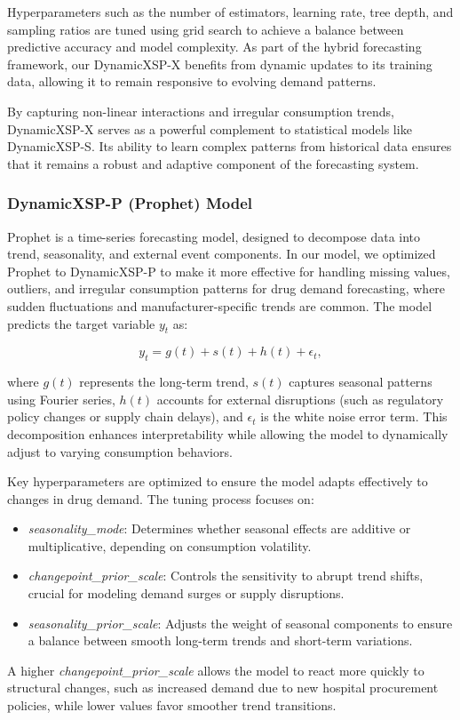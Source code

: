 \documentclass[journal]{IEEEtran}
\begin{document}
Hyperparameters such as the number of estimators, learning rate, tree depth, and sampling ratios are tuned using grid search to achieve a balance between predictive accuracy and model complexity. As part of the hybrid forecasting framework, our DynamicXSP-X benefits from dynamic updates to its training data, allowing it to remain responsive to evolving demand patterns.

By capturing non-linear interactions and irregular consumption trends, DynamicXSP-X serves as a powerful complement to statistical models like DynamicXSP-S. Its ability to learn complex patterns from historical data ensures that it remains a robust and adaptive component of the forecasting system.

\subsubsection{DynamicXSP-P (Prophet) Model}

Prophet is a time-series forecasting model, designed to decompose data into trend, seasonality, and external event components. In our model, we optimized Prophet to DynamicXSP-P to make it more effective for handling missing values, outliers, and irregular consumption patterns for drug demand forecasting, where sudden fluctuations and manufacturer-specific trends are common. The model predicts the target variable \(y_t\) as:

\begin{equation}
y_{t} = g(t) + s(t) + h(t) + \epsilon_{t},
\end{equation}

where \(g(t)\) represents the long-term trend, \(s(t)\) captures seasonal patterns using Fourier series, \(h(t)\) accounts for external disruptions (such as regulatory policy changes or supply chain delays), and \(\epsilon_{t}\) is the white noise error term. This decomposition enhances interpretability while allowing the model to dynamically adjust to varying consumption behaviors.

Key hyperparameters are optimized to ensure the model adapts effectively to changes in drug demand. The tuning process focuses on:
\begin{itemize}
    \item \textit{seasonality\_mode}: Determines whether seasonal effects are additive or multiplicative, depending on consumption volatility.
    \item \textit{changepoint\_prior\_scale}: Controls the sensitivity to abrupt trend shifts, crucial for modeling demand surges or supply disruptions.
    \item \textit{seasonality\_prior\_scale}: Adjusts the weight of seasonal components to ensure a balance between smooth long-term trends and short-term variations.
\end{itemize}
A higher \textit{changepoint\_prior\_scale} allows the model to react more quickly to structural changes, such as increased demand due to new hospital procurement policies, while lower values favor smoother trend transitions.
\end{document}
